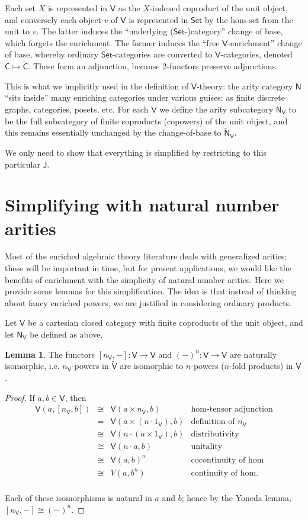 \documentclass{amsart}
\theoremstyle{definition}
\newtheorem{lemma}[theorem]{Lemma}
\newcommand{\Set}{\mathsf{Set}}
\newcommand{\NN}{\mathsf{N}}
\newcommand{\V}{\mathsf{V}}
\newcommand{\C}{\mathsf{C}}
\newcommand{\J}{\mathsf{J}}
\newcommand{\maps}{\colon}
\begin{document}
Each set $X$ is represented in $\V$ as the $X$-indexed coproduct of the unit object, and conversely each object $v$ of $\V$ is represented in $\Set$ by the hom-set from the unit to $v$. The latter induces the ``underlying ($\Set$-)category'' change of base, which forgets the enrichment. The former induces the ``free $\V$-enrichment'' change of base, whereby ordinary $\Set$-categories are converted to $\V$-categories, denoted $\C \mapsto \tilde{\C}$. These form an adjunction, because 2-functors preserve adjunctions.

This is what we implicitly used in the definition of $\V$-theory: the arity category $\NN$ ``sits inside'' many enriching categories under various guises: as finite discrete graphs, categories, posets, etc. For each $\V$ we define the arity subcategory $\NN_\V$ to be the full subcategory of finite coproducts (copowers) of the unit object, and this remains essentially unchanged by the change-of-base to $\tilde{\NN}_\V$.

We only need to show that everything is simplified by restricting to this particular $\J$.

\section{Simplifying with natural number arities}

Most of the enriched algebraic theory literature deals with generalized arities; these will be important in time, but for present applications, we would like the benefits of enrichment with the simplicity of natural number arities. Here we provide some lemmas for this simplification. The idea is that instead of thinking about fancy enriched powers, we are justified in considering ordinary products.

Let $\V$ be a cartesian closed category with finite coproducts of the unit object, and let $\NN_\V$ be defined as above.

\begin{lemma}
	The functors $[n_\V,-]\maps \V\to \V$ and $(-)^n\maps \V\to \V$ are naturally isomorphic, i.e. $n_\V$-powers in $\tilde{\V}$ are isomorphic to $n$-powers ($n$-fold products) in $\V$.
\end{lemma}
\begin{proof}
	If $a,b \in \V$, then
	\[\begin{array}{rcll}
	\V(a,[n_\V,b]) & \cong & \V(a\times n_\V,b) & \text{hom-tensor adjunction}\\
	& = & \V(a\times (n \cdot 1_\V),b) & \text{definition of } n_\V\\
	& \cong & \V(n \cdot (a\times 1_\V),b) & \text{distributivity}\\
	& \cong & \V(n\cdot a,b) & \text{unitality}\\
	& \cong & \V(a,b)^n & \text{cocontinuity of hom}\\
	& \cong & V(a,b^n) & \text{continuity of hom}.\\
	\end{array}\]

Each of these isomorphisms is natural in $a$ and $b$; hence by the Yoneda lemma, $[n_\V,-] \cong (-)^n$.
\end{proof}
\end{document}
